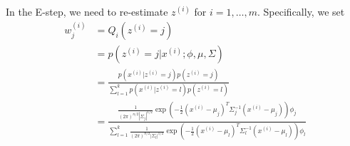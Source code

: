 \begin{answer}
In the E-step, we need to re-estimate $z^{(i)}$ for $i = 1, \ldots, m$. Specifically, we set
$$
\begin{aligned}
w^{(i)}_j &= Q_i(z^{(i)} = j)\\
&= p(z^{(i)} = j|x^{(i)}; \phi, \mu, \Sigma)\\
&= \frac{p(x^{(i)}|z^{(i)} = j)p(z^{(i)} =j)}{\sum_{l=1}^k p(x^{(i)}|z^{(i)} = l)p(z^{(i)} = l)}\\
&= \frac{\frac{1}{(2\pi)^{n/2}|\Sigma_j|^{1/2}}\exp(-\frac{1}{2}(x^{(i)} - \mu_j)^T\Sigma_j^{-1}(x^{(i)} - \mu_j))\phi_j}{\sum_{l=1}^k\frac{1}{(2\pi)^{n/2}|\Sigma_l|^{1/2}}\exp(-\frac{1}{2}(x^{(i)} - \mu_l)^T\Sigma_l^{-1}(x^{(i)} - \mu_l))\phi_l}
\end{aligned}
$$



\end{answer}
